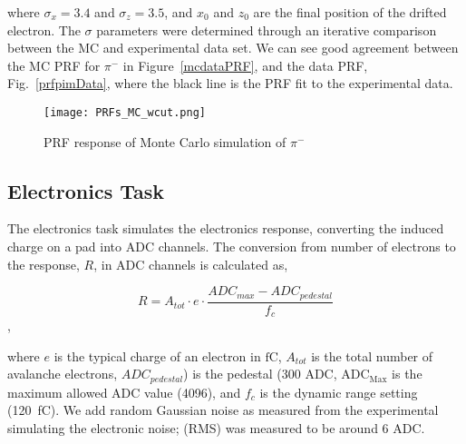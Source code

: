 where $\sigma_x = 3.4$ and $\sigma_z = 3.5$, and $x_0$ and $z_0$ are the final position of the drifted electron. The $\sigma$ parameters were determined through an iterative comparison between the MC and experimental data set. We can see good agreement between the MC PRF for $\pi^-$ in Figure~\ref{mcdataPRF}, and the data PRF, Fig.~\ref{prfpimData}, where the black line is the PRF fit to the experimental data.

\begin{figure}[!htb]
         \centering
         \texttt{[image: PRFs\_MC\_wcut.png]}
         \caption{PRF response of Monte Carlo simulation of $\pi^-$}
         \label{fig:prfpimMC}
\end{figure}



\subsection{Electronics Task}


The electronics task simulates the electronics response, converting  the induced charge on a pad into ADC channels. The conversion from number of electrons to the response, $R$, in ADC channels is calculated as, 

\begin{equation}
R = A_{tot} \cdot e \cdot\frac{ADC_{max} - ADC_{pedestal}}{f_c}
\label{eq:etoADC}
\end{equation},

where $e$ is the typical charge of an electron in $\si{\femto \coulomb}$, $A_{tot}$ is the total number of avalanche electrons, $ADC_{pedestal}$) is the pedestal (300 ADC, $\mathrm{ADC_{Max}}$ is the maximum allowed ADC value (4096), and $f_c$ is the dynamic range setting (\SI{120}{\femto\coulomb}). We add random Gaussian noise as measured from the experimental simulating the electronic noise; (RMS) was measured to be around 6 ADC. 

